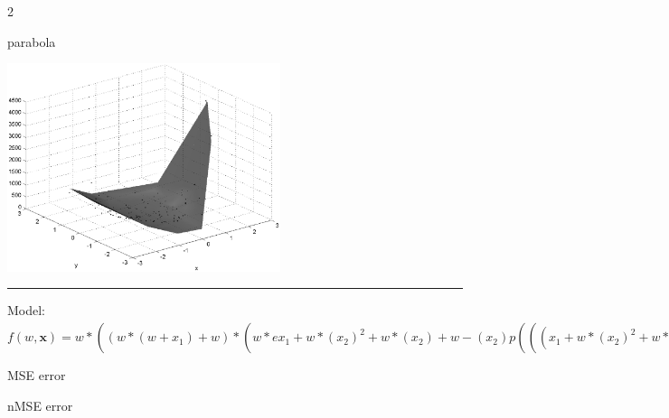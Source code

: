 \documentclass[12pt]{article}
\begin{document}
\begin{multicols}{2}
\begin{bundle}{parabola}\end{bundle}

\columnbreak
\includegraphics[width=8cm]{5.eps}
\end{multicols}

\hrule
\vspace{1cm}
Model: $f(w,\mathbf{x})=w*((w*(w+x_1)+w)*(w*ex_1+w*(x_2)^2+w*(x_2)+w-(x_2)p(((x_1+w*(x_2)^2+w*(x_2)+w-(x_2)-w)^2)*w)))^2+w*((w*(w+x_1)+w)*(w*ex_1+w*(x_2)^2+w*(x_2)+w-(x_2)p(((x_1+w*(x_2)^2+w*(x_2)+w-(x_2)-w)^2)*w)))+w$

MSE error

nMSE error
\end{document}
